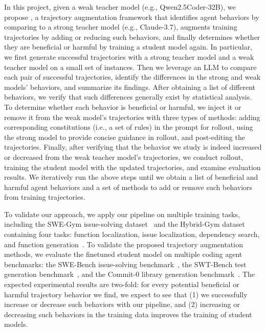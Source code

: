 In this project, given a weak teacher model (e.g., Qwen2.5Coder-32B), we propose \plusname, a trajectory augmentation framework that identifies agent behaviors by comparing to a strong teacher model (e.g., Claude-3.7), augments training trajectories by adding or reducing such behaviors, and finally determines whether they are beneficial or harmful by training a student model again.
In particular, we first generate successful trajectories with a strong teacher model and a weak teacher model on a small set of instances. Then we leverage an LLM to compare each pair of successful trajectories, identify the differences in the strong and weak models' behaviors, and summarize its findings.
After obtaining a list of different behaviors, we verify that such differences generally exist by statistical analysis.
To determine whether each behavior is beneficial or harmful, we inject it or remove it from the weak model's trajectories with three types of methods: adding corresponding constitutions (i.e., a set of rules) in the prompt for rollout, using the strong model to provide concise guidance in rollout, and post-editing the trajectories.
Finally, after verifying that the behavior we study is indeed increased or decreased from the weak teacher model's trajectories, we conduct rollout, training the student model with the updated trajectories, and examine evaluation results.
We iteratively run the above steps until we obtain a list of beneficial and harmful agent behaviors and a set of methods to add or remove such behaviors from training trajectories.

To validate our approach, we apply our pipeline on multiple training tasks, including the SWE-Gym issue-solving dataset~\cite{swegym} and the Hybrid-Gym dataset containing four tasks: function localization, issue localization, dependency search, and function generation~\cite{hybrid-gym}.
To validate the proposed trajectory augmentation methods, we evaluate the finetuned student model on multiple coding agent benchmarks: the SWE-Bench issue-solving benchmark~\cite{swebench}, the SWT-Bench test generation benchmark~\cite{swt-bench}, and the Commit-0 library generation benchmark~\cite{commit0}.
The expected experimental results are two-fold: 
for every potential beneficial or harmful trajectory behavior we find, we expect to see that (1) we successfully increase or decrease such behaviors with our pipeline, and (2) increasing or decreasing such behaviors in the training data improves the training of student models.






